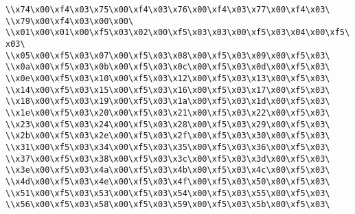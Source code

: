 \verb|\\x74\x00\xf4\x03\x75\x00\xf4\x03\x76\x00\xf4\x03\x77\x00\xf4\x03\|\newline
\verb|\\x79\x00\xf4\x03\x00\x00\|\newline
\verb|\\x01\x00\x01\x00\xf5\x03\x02\x00\xf5\x03\x03\x00\xf5\x03\x04\x00\xf5\x03\|\newline
\verb|\\x05\x00\xf5\x03\x07\x00\xf5\x03\x08\x00\xf5\x03\x09\x00\xf5\x03\|\newline
\verb|\\x0a\x00\xf5\x03\x0b\x00\xf5\x03\x0c\x00\xf5\x03\x0d\x00\xf5\x03\|\newline
\verb|\\x0e\x00\xf5\x03\x10\x00\xf5\x03\x12\x00\xf5\x03\x13\x00\xf5\x03\|\newline
\verb|\\x14\x00\xf5\x03\x15\x00\xf5\x03\x16\x00\xf5\x03\x17\x00\xf5\x03\|\newline
\verb|\\x18\x00\xf5\x03\x19\x00\xf5\x03\x1a\x00\xf5\x03\x1d\x00\xf5\x03\|\newline
\verb|\\x1e\x00\xf5\x03\x20\x00\xf5\x03\x21\x00\xf5\x03\x22\x00\xf5\x03\|\newline
\verb|\\x23\x00\xf5\x03\x24\x00\xf5\x03\x28\x00\xf5\x03\x29\x00\xf5\x03\|\newline
\verb|\\x2b\x00\xf5\x03\x2e\x00\xf5\x03\x2f\x00\xf5\x03\x30\x00\xf5\x03\|\newline
\verb|\\x31\x00\xf5\x03\x34\x00\xf5\x03\x35\x00\xf5\x03\x36\x00\xf5\x03\|\newline
\verb|\\x37\x00\xf5\x03\x38\x00\xf5\x03\x3c\x00\xf5\x03\x3d\x00\xf5\x03\|\newline
\verb|\\x3e\x00\xf5\x03\x4a\x00\xf5\x03\x4b\x00\xf5\x03\x4c\x00\xf5\x03\|\newline
\verb|\\x4d\x00\xf5\x03\x4e\x00\xf5\x03\x4f\x00\xf5\x03\x50\x00\xf5\x03\|\newline
\verb|\\x51\x00\xf5\x03\x53\x00\xf5\x03\x54\x00\xf5\x03\x55\x00\xf5\x03\|\newline
\verb|\\x56\x00\xf5\x03\x58\x00\xf5\x03\x59\x00\xf5\x03\x5b\x00\xf5\x03\|\newline
